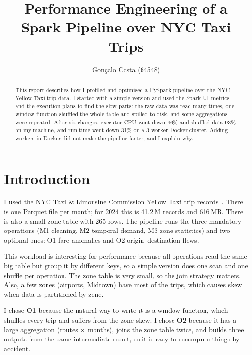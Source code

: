 \documentclass[sigconf]{acmart}
\begin{document}
\title{Performance Engineering of a Spark Pipeline over NYC Taxi Trips}

\author{Gonçalo Costa (64548)}

\begin{abstract}
This report describes how I profiled and optimised a PySpark pipeline over the
NYC Yellow Taxi trip data. I started with a simple version and used the Spark
UI metrics and the execution plans to find the slow parts: the raw data was
read many times, one window function shuffled the whole table and spilled to
disk, and some aggregations were repeated. After six changes, executor CPU
went down 46\% and shuffled data 93\% on my machine, and run time went down
31\% on a 3-worker Docker cluster. Adding workers in Docker did not make the
pipeline faster, and I explain why.
\end{abstract}


\maketitle

\section{Introduction}

I used the NYC Taxi \& Limousine Commission Yellow Taxi trip
records~\cite{tlc}. There is one Parquet file per month; for 2024 this is
41.2\,M records and 616\,MB. There is also a small zone table with 265 rows.
The pipeline runs the three mandatory operations (M1 cleaning, M2 temporal
demand, M3 zone statistics) and two optional ones: O1 fare anomalies and O2
origin--destination flows.

This workload is interesting for performance because all operations read the
same big table but group it by different keys, so a simple version does one
scan and one shuffle per operation. The zone table is very small, so the join
strategy matters. Also, a few zones (airports, Midtown) have most of the
trips, which causes skew when data is partitioned by zone.

I chose \textbf{O1} because the natural way to write it is a window function,
which shuffles every trip and suffers from the zone skew. I chose \textbf{O2}
because it has a large aggregation (routes $\times$ months), joins the zone
table twice, and builds three outputs from the same intermediate result, so it
is easy to recompute things by accident.
\end{document}
